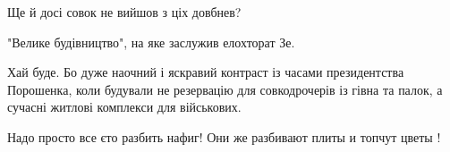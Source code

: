 \begin{itemize}
 

Ще й досі совок не вийшов з ціх довбнев?

 

"Велике будівництво", на яке заслужив елохторат Зе.

Хай буде. Бо дуже наочний і яскравий контраст із часами президентства
Порошенка, коли будували не резервацію для совкодрочерів із гівна та палок, а
сучасні житлові комплекси для військових.


 
Надо просто все єто разбить нафиг! Они же разбивают плиты и топчут цветы !


\end{itemize}

